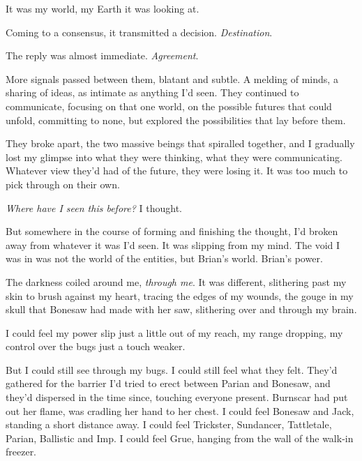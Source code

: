 It was my world, my Earth it was looking at.



Coming to a consensus, it transmitted a decision.  \emph{Destination}.



The reply was almost immediate.  \emph{Agreement}.



More signals passed between them, blatant and subtle.  A melding of minds, a sharing of ideas, as intimate as anything I'd seen.  They continued to communicate, focusing on that one world, on the possible futures that could unfold, committing to none, but explored the possibilities that lay before them.



They broke apart, the two massive beings that spiralled together, and I gradually lost my glimpse into what they were thinking, what they were communicating.  Whatever view they'd had of the future, they were losing it.  It was too much to pick through on their own.



\emph{Where have I seen this before?  }I thought.



But somewhere in the course of forming and finishing the thought, I'd broken away from whatever it was I'd seen.  It was slipping from my mind.  The void I was in was not the world of the entities, but Brian's world.  Brian's power.



The darkness coiled around me, \emph{through me}.  It was different, slithering past my skin to brush against my heart, tracing the edges of my wounds, the gouge in my skull that Bonesaw had made with her saw, slithering over and through my brain.



I could feel my power slip just a little out of my reach, my range dropping, my control over the bugs just a touch weaker.



But I could still see through my bugs.  I could still feel what they felt.  They'd gathered for the barrier I'd tried to erect between Parian and Bonesaw, and they'd dispersed in the time since, touching everyone present.  Burnscar had put out her flame, was cradling her hand to her chest.  I could feel Bonesaw and Jack, standing a short distance away.  I could feel Trickster, Sundancer, Tattletale, Parian, Ballistic and Imp.  I could feel Grue, hanging from the wall of the walk-in freezer.



